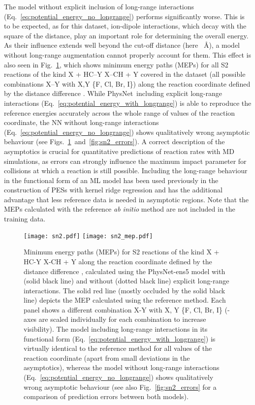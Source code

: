 \documentclass[12pt]{article}
\newcommand{\nn}{PhysNet}
\begin{document}
The model without explicit inclusion of long-range interactions
(Eq.~\ref{eq:potential_energy_no_longrange}) performs significantly
worse. This is to be expected, as for this dataset, ion-dipole
interactions, which decay with the square of the distance, play an
important role for determining the overall energy. As their influence
extends well beyond the cut-off distance  (here
~\AA), a model without long-range augmentation cannot properly
account for them. This effect is also seen in Fig.~\ref{fig:sn2_mep},
which shows minimum energy paths (MEPs) for all S2 reactions
of the kind X + HC--Y  X--CH + Y
covered in the dataset (all possible combinations X--Y with X,Y 
\{F, Cl, Br, I\}) along the reaction coordinate defined by the
distance difference .  While \nn\ including
explicit long-range interactions
(Eq.~\ref{eq:potential_energy_with_longrange}) is able to reproduce
the reference energies accurately across the whole range of values of
the reaction coordinate, the NN without long-range interactions
(Eq.~\ref{eq:potential_energy_no_longrange}) shows qualitatively wrong
asymptotic behaviour (see
Figs.~\ref{fig:sn2_mep}~and~\ref{fig:sn2_errors}). A correct
description of the asymptotics is crucial for quantitative predictions
of reaction rates with MD simulations, as errors can strongly
influence the maximum impact parameter for collisions at which a
reaction is still possible. Including the long-range behaviour in the
functional form of an ML model has been used previously in the
construction of PESs with kernel ridge regression and has the
additional advantage that less reference data is needed in asymptotic
regions.\cite{unke2017toolkit} Note that the MEPs calculated with the
reference \textit{ab initio} method are not included in the training
data.

\begin{figure}[htbp]
\centering
\captionsetup{width=1.0\textwidth}
\texttt{[image: sn2.pdf]}
\texttt{[image: sn2\_mep.pdf]}
\caption{Minimum energy paths (MEPs) for S2 reactions of the
  kind X + HC-Y  X-CH + Y along the
  reaction coordinate defined by the distance difference , calculated using the \nn-ens5 model with (solid
  black line) and without (dotted black line) explicit long-range
  interactions. The solid red line (mostly occluded by the solid black
  line) depicts the MEP calculated using the reference method. Each
  panel shows a different combination X-Y with X, Y  \{F, Cl, Br,
  I\} (-axes are scaled individually for each combination to
  increase visibility). The model including long-range interactions in
  its functional form (Eq.~\ref{eq:potential_energy_with_longrange})
  is virtually identical to the reference method for all values of the
  reaction coordinate (apart from small deviations in the
  asymptotics), whereas the model without long-range interactions
  (Eq.~\ref{eq:potential_energy_no_longrange}) shows qualitatively
  wrong asymptotic behaviour (see also Fig.~\ref{fig:sn2_errors} for a
  comparison of prediction errors between both models).}
	\label{fig:sn2_mep}
\end{figure}
\end{document}
